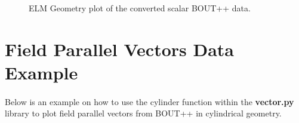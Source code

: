 \documentclass[12pt,a4paper]{article}
\begin{document}
\begin{figure}[H]
	\centering
	\caption{ELM Geometry plot of the converted scalar BOUT++ data.}
	\label{fig:elm_scalar}
\end{figure}


\section{Field Parallel Vectors Data Example}
\label{example:vector}
\paragraph{} Below is an example on how to use the cylinder function within the \textbf{vector.py} library to plot field parallel vectors from BOUT++ in cylindrical geometry.
\end{document}
